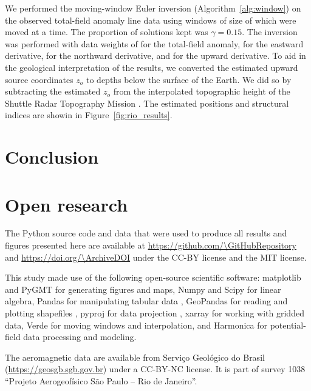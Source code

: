 We performed the moving-window Euler inversion (Algorithm~\ref{alg:window}) on the observed total-field anomaly line data using windows of size of \RioWindowSize{} which were moved \RioWindowStep{} at a time.
The proportion of solutions kept was $\gamma=0.15$.
The inversion was performed with data weights of \RioWeightsF{} for the total-field anomaly, \RioWeightsE{} for the eastward derivative, \RioWeightsN{} for the northward derivative, and \RioWeightsU{} for the upward derivative.
To aid in the geological interpretation of the results, we converted the estimated upward source coordinates $z_o$ to depths below the surface of the Earth.
We did so by subtracting the estimated $z_o$ from the interpolated topographic height of the Shuttle Radar Topography Mission \citep[SRTM;][]{SRTM}.
The estimated positions and structural indices are showin in Figure~\ref{fig:rio_results}.



\section{Conclusion}



\section{Open research}

The Python source code and data that were used to produce all results and
figures presented here are available at
\url{https://github.com/\GitHubRepository}
and \url{https://doi.org/\ArchiveDOI} \citep{figshare}
under the CC-BY license and the MIT license.

This study made use of the following open-source scientific software:
matplotlib \citep{matplotlib} and PyGMT \citep{pygmt} for generating figures
and maps,
Numpy \citep{numpy} and Scipy \citep{scipy} for linear algebra,
Pandas for manipulating tabular data \citep{McKinney2010,pandas},
GeoPandas for reading and plotting shapefiles \citep{geopandas},
pyproj for data projection \citep{pyproj},
xarray \citep{xarray} for working with gridded data,
Verde \citep{verde} for moving windows and interpolation,
and
Harmonica \citep{harmonica} for potential-field data processing and modeling.

The aeromagnetic data are available from Serviço Geológico do Brasil
(\url{https://geosgb.sgb.gov.br}) under a CC-BY-NC license. It is part of
survey 1038 ``Projeto Aerogeofísico São Paulo -- Rio de Janeiro''.



